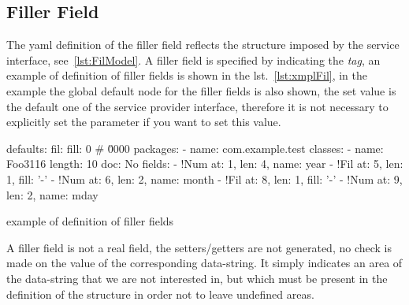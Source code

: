 \documentclass[a4paper,10pt]{report}
\newenvironment{elisting}[1][H]
  {\captionsetup{aboveskip=0pt}\begin{listing}[#1]}
  {\end{listing}%
}
\begin{document}
\subsection{Filler Field} \label{sub:yaml.fil}
The yaml definition of the filler field reflects the structure imposed by the 
service interface, see~\ref{lst:FilModel}. 
A filler field is specified by indicating the 
 \textsl{tag}, an example of 
definition of filler fields is shown in the lst.~\ref{lst:xmplFil}, in the 
example the global default node for the filler fields is also shown, the set 
value is the default one of the service provider interface, therefore it is not 
necessary to explicitly set the parameter if you want to set this value.

\begin{elisting}[!htb]
\begin{yamlcode}
defaults:
  fil:
    fill: 0             # \u0000
packages:
  - name: com.example.test
    classes:
      - name: Foo3116
        length: 10
        doc: No
        fields:
          - !Num { at: 1, len: 4, name: year }
          - !Fil { at: 5, len: 1, fill: '-' }
          - !Num { at: 6, len: 2, name: month }
          - !Fil { at: 8, len: 1, fill: '-' }
          - !Num { at: 9, len: 2, name: mday }
\end{yamlcode}
\caption{example of definition of filler fields}
\label{lst:xmplFil}
\end{elisting}
A filler field is not a real field, the setters/getters are not generated, no 
check is made on the value of the corresponding data-string. It simply indicates 
an area of the data-string that we are not interested in, but which must be 
present in the definition of the structure in order not to leave undefined areas.
\end{document}
